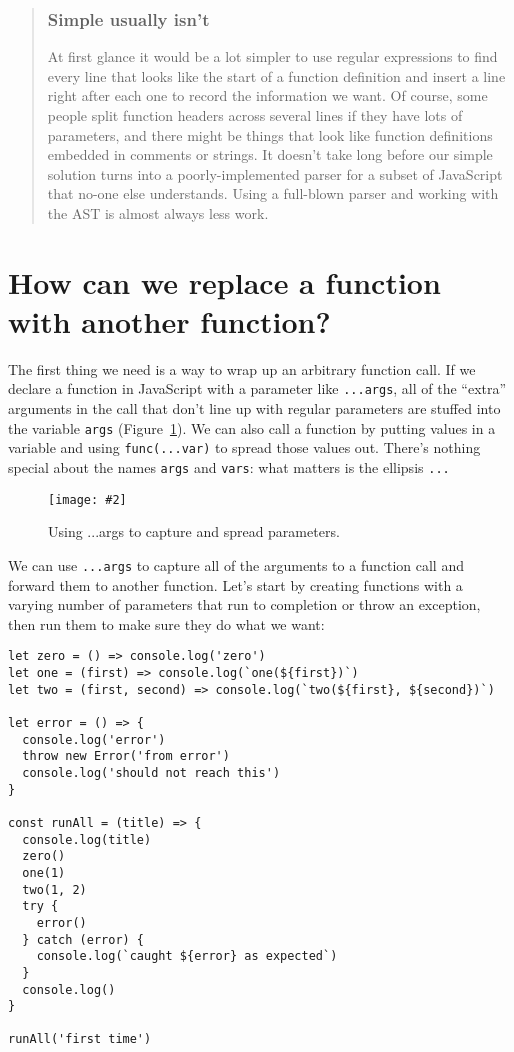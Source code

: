 \documentclass[krantzl]{krantz}
\newcommand{\figpdf}[4]{\begin{figure}%
\centering%
\texttt{[image: \#2]}%
\caption{#3}%
\label{#1}%
\end{figure}}
\newcommand{\figref}[1]{Figure~\ref{#1}}
\newenvironment{callout}{\savenotes\begin{tBox}\begin{quotation}\toggletrue{inbox}\renewcommand{\thempfootnote}{\arabic{footnote}}}{\end{quotation}\vspace{\baselineskip}\end{tBox}\togglefalse{inbox}\spewnotes}
\begin{document}
\begin{callout}


\subsubsection*{Simple usually isn’t}


At first glance it would be a lot simpler
to use regular expressions to find every line that looks like the start of a function definition
and insert a line right after each one
to record the information we want.
Of course,
some people split function headers across several lines if they have lots of parameters,
and there might be things that look like function definitions embedded in comments or strings.
It doesn’t take long before our simple solution turns into
a poorly-implemented parser for a subset of JavaScript that no-one else understands.
Using a full-blown parser and working with the AST is almost always less work.

\end{callout}

\section{How can we replace a function with another function?}\label{code-generator-replace}


The first thing we need is a way to wrap up an arbitrary function call.
If we declare a function in JavaScript with a parameter like \texttt{...args},
all of the “extra” arguments in the call that don’t line up with regular parameters
are stuffed into the variable \texttt{args}
(\figref{code-generator-spread}).
We can also call a function by putting values in a variable
and using \texttt{func(...var)} to spread those values out.
There’s nothing special about the names \texttt{args} and \texttt{vars}:
what matters is the ellipsis \texttt{...}

\figpdf{code-generator-spread}{./code-generator/spread.pdf}{Using ...args to capture and spread parameters.}{0.6}


We can use \texttt{...args} to capture all of the arguments to a function call
and forward them to another function.
Let’s start by creating functions with a varying number of parameters
that run to completion or throw an exception,
then run them to make sure they do what we want:


\newpage


\begin{lstlisting}[frame=tblr]
let zero = () => console.log('zero')
let one = (first) => console.log(`one(${first})`)
let two = (first, second) => console.log(`two(${first}, ${second})`)

let error = () => {
  console.log('error')
  throw new Error('from error')
  console.log('should not reach this')
}

const runAll = (title) => {
  console.log(title)
  zero()
  one(1)
  two(1, 2)
  try {
    error()
  } catch (error) {
    console.log(`caught ${error} as expected`)
  }
  console.log()
}

runAll('first time')
\end{lstlisting}
\end{document}

